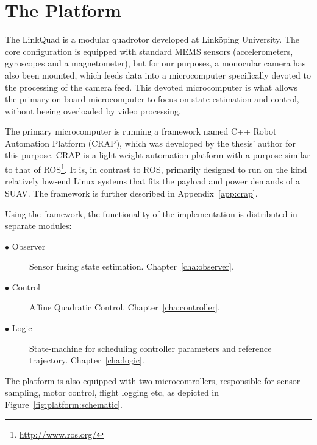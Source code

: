 \section{The Platform}
    The LinkQuad is a modular quadrotor developed at Linköping University.
    The core configuration is equipped with standard MEMS sensors
    (accelerometers, gyroscopes and a magnetometer),
    but for our purposes, a monocular camera has also been mounted, which feeds data
    into a microcomputer specifically devoted to the processing of the camera feed.
    This devoted microcomputer is what allows the primary on-board microcomputer
    to focus on state estimation and control, without beeing overloaded by
    video processing.

    The primary microcomputer is running a framework named C++ Robot Automation Platform (CRAP),
    which was developed by the thesis' author for this purpose. CRAP is a light-weight
    automation platform with a purpose similar to that of ROS\footnote{\url{http://www.ros.org/}}.
    It is, in contrast to ROS, primarily designed to run on the kind relatively low-end Linux systems
    that fits the payload and power demands of a SUAV. The framework is further
    described in Appendix~\ref{app:crap}.

    Using the framework, the functionality of the implementation is
    distributed in separate modules:
    \begin{description}
        \item[$\bullet$ Observer] Sensor fusing state estimation. Chapter~\ref{cha:observer}.
        \item[$\bullet$ Control]  Affine Quadratic Control. Chapter~\ref{cha:controller}.
        \item[$\bullet$ Logic]    State-machine for scheduling controller parameters and reference trajectory. Chapter~\ref{cha:logic}.
    \end{description}

    The platform is also equipped with two microcontrollers, responsible
    for sensor sampling, motor control, flight logging etc, as depicted in
    Figure~\ref{fig:platform:schematic}.


